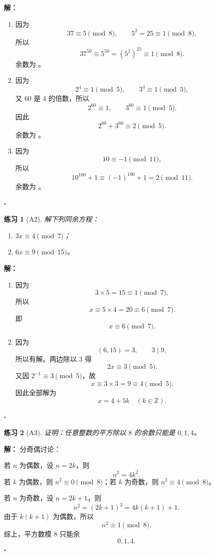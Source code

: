 \documentclass[11pt,a4paper,fontset=fandol]{ctexart}
\theoremstyle{formaltheorem}
\theoremstyle{formalexample}
\newtheorem{exercise}{练习}[section]
\newenvironment{solution}{\par\noindent\textbf{解：}}{\hfill$\square$\par}
\begin{document}
\begin{solution}
\begin{enumerate}
  \item 因为
  \[
  37\equiv 5\pmod 8,\qquad 5^2=25\equiv 1\pmod 8,
  \]
  所以
  \[
  37^{50}\equiv 5^{50}=(5^2)^{25}\equiv 1\pmod 8.
  \]
  余数为 。

  \item 因为
  \[
  2^4\equiv 1\pmod 5,\qquad 3^4\equiv 1\pmod 5,
  \]
  又 $60$ 是 $4$ 的倍数，所以
  \[
  2^{60}\equiv 1,\qquad 3^{60}\equiv 1\pmod 5.
  \]
  因此
  \[
  2^{60}+3^{60}\equiv 2\pmod 5.
  \]
  余数为 。

  \item 因为
  \[
  10\equiv -1\pmod{11},
  \]
  所以
  \[
  10^{100}+1\equiv (-1)^{100}+1=2\pmod{11}.
  \]
  余数为 。
\end{enumerate}
\end{solution}

\begin{exercise}[A2]
解下列同余方程：
\begin{enumerate}
  \item $3x\equiv 4\pmod 7$；
  \item $6x\equiv 9\pmod{15}$。
\end{enumerate}
\end{exercise}

\begin{solution}
\begin{enumerate}
  \item 因为
  \[
  3\times 5=15\equiv 1\pmod 7,
  \]
  所以
  \[
  x\equiv 5\times 4=20\equiv 6\pmod 7.
  \]
  即
  \[
  \boxed{x\equiv 6\pmod 7}.
  \]

  \item 因为
  \[
  (6,15)=3,\qquad 3\mid 9,
  \]
  所以有解。两边除以 $3$ 得
  \[
  2x\equiv 3\pmod 5.
  \]
  又因 $2^{-1}\equiv 3\pmod 5$，故
  \[
  x\equiv 3\times 3=9\equiv 4\pmod 5.
  \]
  因此全部解为
  \[
  \boxed{x=4+5k\quad (k\in \mathbb{Z})}.
  \]
\end{enumerate}
\end{solution}

\begin{exercise}[A3]
证明：任意整数的平方除以 $8$ 的余数只能是 $0,1,4$。
\end{exercise}

\begin{solution}
分奇偶讨论：

若 $n$ 为偶数，设 $n=2k$，则
\[
n^2=4k^2.
\]
若 $k$ 为偶数，则 $n^2\equiv 0\pmod 8$；若 $k$ 为奇数，则 $n^2\equiv 4\pmod 8$。

若 $n$ 为奇数，设 $n=2k+1$，则
\[
n^2=(2k+1)^2=4k(k+1)+1.
\]
由于 $k(k+1)$ 为偶数，所以
\[
n^2\equiv 1\pmod 8.
\]
综上，平方数模 $8$ 只能余
\[
\boxed{0,1,4}.
\]
\end{solution}
\end{document}
